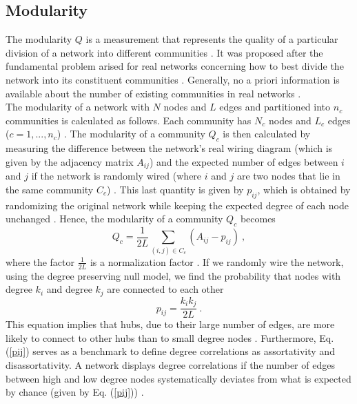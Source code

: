 \documentclass[11 pt , letterpaper , twoside , openright]{book}
\begin{document}
\subsection{Modularity}

The modularity $Q$ is a measurement that represents the quality of a particular division of a network into different communities \cite{F.Costa2007}. It was proposed after the fundamental problem arised for real networks concerning how to best divide the network into its constituent communities \cite{F.Costa2007}. Generally, no a priori information is available about the number of existing communities in real networks \cite{F.Costa2007}.\\
\newline
The modularity of a network with $N$ nodes and $L$ edges and partitioned into $n_c$ communities is calculated as follows. Each community has $N_c$ nodes and $L_c$ edges ($c = 1,..., n_c$) \cite{Albert2016}. The modularity of a community $Q_c$ is then calculated by measuring the difference between the network's real wiring diagram (which is given by the adjacency matrix $A_{ij}$) and the expected number of edges between $i$ and $j$ if the network is randomly wired (where $i$ and $j$ are two nodes that lie in the same community $C_c$) \cite{Albert2016}. This last quantity is given by $p_{ij}$, which is obtained by randomizing the original network while keeping the expected degree of each node unchanged \cite{Albert2016}. Hence, the modularity of a community $Q_c$ becomes
\begin{equation}
	Q_c = \frac{1}{2L}\sum_{(i,j) \in C_c} (A_{ij} - p_{ij}) \ ,
\end{equation}
where the factor $\frac{1}{2L}$ is a normalization factor \cite{Albert2016}. If we randomly wire the network, using the degree preserving null model, we find the probability that nodes with degree $k_i$ and degree $k_j$ are connected to each other \cite{Bara2016}
\begin{equation}\label{pij}
	p_{ij} = \frac{k_ik_j}{2L} \ .
\end{equation}
This equation implies that hubs, due to their large number of edges, are more likely to connect to other hubs than to small degree nodes \cite{Bara2016}. Furthermore, Eq. (\ref{pij}) serves as a benchmark to define degree correlations as assortativity and disassortativity. A network displays degree correlations if the number of edges between high and low degree nodes systematically deviates from what is expected by chance (given by Eq. (\ref{pij})) \cite{Bara2016}. \\
\end{document}
